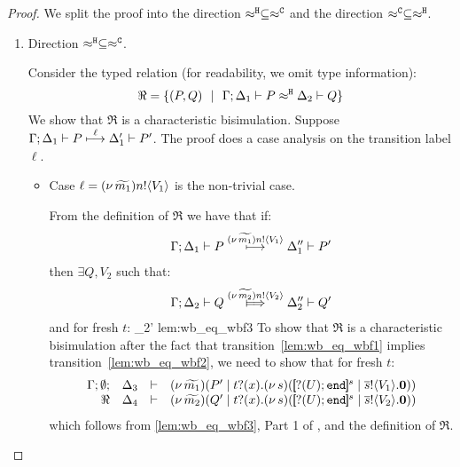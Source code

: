 \begin{proof}
	\noi
	We split the proof into the direction
	$\approx^\mathtt{H} \subseteq \approx^\mathtt{C}$ and the direction
	$\approx^\mathtt{C} \subseteq \approx^\mathtt{H}$.

	\begin{enumerate}
		\item	Direction $\approx^\mathtt{H} \subseteq \approx^\mathtt{C}$.

				\noi Consider the typed relation (for readability, we omit type information):
				\[
					\Re = \{
								(P, Q) 
								\ \ |\ \ 
								\Gamma; \Delta_1 \vdash P \approx^\mathtt{H} \Delta_2 \vdash Q\}
				\]
				We show that $\Re$ is a characteristic bisimulation.
				Suppose
				$
						\Gamma; \Delta_1 \vdash P \stackrel{ \ell}{\longmapsto} \Delta_1' \vdash P'
				$.
				The proof does a case analysis on the transition label $\ell$.
				\begin{itemize}
					\item	Case $\ell = (\nu\, \widetilde{m_1}) n ! \langle V_1 \rangle$ is the non-trivial case.

							\noi From the definition of $\Re$ we have that if:
							\begin{eqnarray}
								\Gamma; \Delta_1 \vdash P \stackrel{(\nu\, \widetilde{m_1}) n ! \langle V_1 \rangle}{\longmapsto} \Delta_1'' \vdash P'
								\label{lem:wb_eq_wbf1}
							\end{eqnarray}
							then $\exists Q, V_2$ such that:
							\begin{eqnarray}
								\horel{\Gamma}{\Delta_2}{Q}{\Hby{\news{\widetilde{m_2}} \bactout{n}{V_2}}}{\Delta_2''}{Q'}
								\label{lem:wb_eq_wbf2}
							\end{eqnarray}
							and for fresh $t$:
								{\hwb}
								{\Delta_2'}{}
								{lem:wb_eq_wbf3}
							\noi 
							To show that $\Re$ is a characteristic bisimulation
							after the fact that transition~\eqref{lem:wb_eq_wbf1} implies transition~\eqref{lem:wb_eq_wbf2},
							we need to show that for fresh $t$:
							\begin{eqnarray}
								\mhorel{\Gamma}{\Delta_3}{\newsp{\widetilde{m_1}}{P' \Par \fotrigger{t}{x}{s}{\btinp{U} \tinact}{V_1}}}
								{\Re}
								{\Delta_4}{}{\newsp{\widetilde{m_2}}{Q' \Par \fotrigger{t}{x}{s}{\btinp{U} \tinact}{V_2}}}
								\label{lem:wb_eq_wbf4}
							\end{eqnarray}
							\noi which follows from \eqref{lem:wb_eq_wbf3}, Part 1 of ,
							and the definition of $\Re$.


\end{itemize}
\end{enumerate}
\end{proof}
